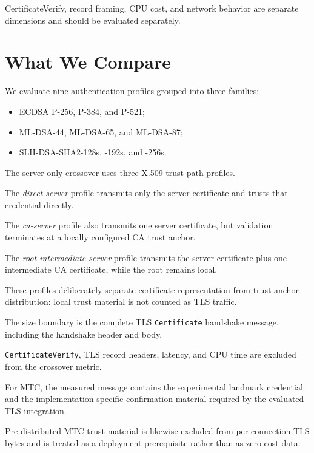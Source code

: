 \documentclass[journal]{IEEEtran}
\begin{document}
CertificateVerify, record framing, CPU cost, and network behavior are separate dimensions and should be evaluated separately.



\section{What We Compare}



We evaluate nine authentication profiles grouped into three families:



\begin{itemize}
  \item ECDSA P-256, P-384, and P-521;
  \item ML-DSA-44, ML-DSA-65, and ML-DSA-87;
  \item SLH-DSA-SHA2-128s, -192s, and -256s.

\end{itemize}



The server-only crossover uses three X.509 trust-path profiles.

The \emph{direct-server} profile transmits only the server certificate and trusts that credential directly.

The \emph{ca-server} profile also transmits one server certificate, but validation terminates at a locally configured CA trust anchor.

The \emph{root-intermediate-server} profile transmits the server certificate plus one intermediate CA certificate, while the root remains local.

These profiles deliberately separate certificate representation from trust-anchor distribution: local trust material is not counted as TLS traffic.



The size boundary is the complete TLS \texttt{Certificate} handshake message, including the handshake header and body.

\texttt{CertificateVerify}, TLS record headers, latency, and CPU time are excluded from the crossover metric.

For MTC, the measured message contains the experimental landmark credential and the implementation-specific confirmation material required by the evaluated TLS integration.

Pre-distributed MTC trust material is likewise excluded from per-connection TLS bytes and is treated as a deployment prerequisite rather than as zero-cost data.
\end{document}
